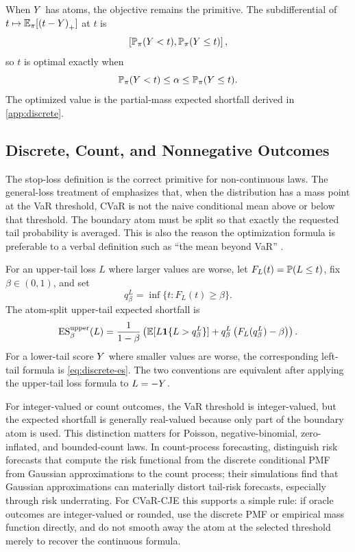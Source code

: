 When $Y$ has atoms, the objective remains the primitive. The subdifferential
of $t\mapsto \mathbb{E}_\pi[\left(t-Y\right)_{+}]$ at $t$ is
\[
\left[\mathbb{P}_\pi(Y<t),\mathbb{P}_\pi(Y\le t)\right],
\]
so $t$ is optimal exactly when
\[
\mathbb{P}_\pi(Y<t)\le \alpha \le \mathbb{P}_\pi(Y\le t).
\]
The optimized value is the partial-mass expected shortfall derived in
\cref{app:discrete}.

\subsection{Discrete, Count, and Nonnegative Outcomes}

The stop-loss definition is the correct primitive for non-continuous laws. The
general-loss treatment of \citet{RockafellarUryasev2002} emphasizes that, when
the distribution has a mass point at the VaR threshold, CVaR is not the naive
conditional mean above or below that threshold. The boundary atom must be split
so that exactly the requested tail probability is averaged. This is also the
reason the optimization formula is preferable to a verbal definition such as
``the mean beyond VaR'' \citep{RockafellarUryasev2000,AcerbiTasche2002}.

For an upper-tail loss $L$ where larger values are worse, let
$F_L(t)=\mathbb{P}(L\le t)$, fix $\beta\in(0,1)$, and set
\[
q_\beta^L=\inf\{t:F_L(t)\ge\beta\}.
\]
The atom-split upper-tail expected shortfall is
\begin{equation}
\mathrm{ES}_\beta^{\mathrm{upper}}(L)
=\frac{1}{1-\beta}
\left(
\mathbb{E}[L\mathbf{1}\{L>q_\beta^L\}]
+q_\beta^L\left(F_L(q_\beta^L)-\beta\right)
\right).
\label{eq:upper-discrete-es}
\end{equation}
For a lower-tail score $Y$ where smaller values are worse, the corresponding
left-tail formula is \cref{eq:discrete-es}. The two conventions are equivalent
after applying the upper-tail loss formula to $L=-Y$.

For integer-valued or count outcomes, the VaR threshold is integer-valued, but
the expected shortfall is generally real-valued because only part of the
boundary atom is used. This distinction matters for Poisson, negative-binomial,
zero-inflated, and bounded-count laws. In count-process forecasting,
\citet{HomburgWeissAlwanFrahmGob2021} distinguish risk forecasts that compute
the risk functional from the discrete conditional PMF from Gaussian
approximations to the count process; their simulations find that Gaussian
approximations can materially distort tail-risk forecasts, especially through
risk underrating. For CVaR-CJE this supports a simple rule: if oracle outcomes
are integer-valued or rounded, use the discrete PMF or empirical mass function
directly, and do not smooth away the atom at the selected threshold merely to
recover the continuous formula.

